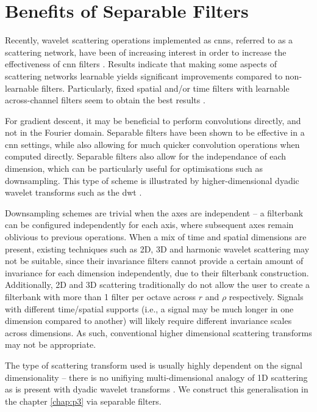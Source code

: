 \section{Benefits of Separable Filters}
\label{sec:p3i:sep}

Recently, wavelet scattering operations implemented as \acp{cnn}, referred to as a scattering network, have been of increasing interest in order to increase the effectiveness of \ac{cnn} filters \cite{2dscattering, scattering_birdsong}. Results indicate that making some aspects of scattering networks learnable yields significant improvements compared to non-learnable filters. Particularly, fixed spatial and/or time filters with learnable across-channel filters seem to obtain the best results \cite{nnphasecollapse}.

For gradient descent, it may be beneficial to perform convolutions directly, and not in the Fourier domain. Separable filters have been shown to be effective in a \ac{cnn} settings, while also allowing for much quicker convolution operations \cite{separablecnn,separablecnn2} when computed directly. Separable filters also allow for the independance of each dimension, which can be particularly useful for optimisations such as downsampling. This type of scheme is illustrated by higher-dimensional dyadic wavelet transforms such as the \ac{dwt} \cite{waveletbook}.

Downsampling schemes are trivial when the axes are independent -- a filterbank can be configured independently for each axis, where subsequent axes remain oblivious to previous operations. When a mix of time and spatial dimensions are present, existing techniques such as 2D, 3D and harmonic wavelet scattering may not be suitable, since their invariance filters cannot provide a certain amount of invariance for each dimension independently, due to their filterbank construction. Additionally, 2D and 3D scattering traditionally do not allow the user to create a filterbank with more than 1 filter per octave across $r$ and $\rho$ respectively. Signals with different time/spatial supports (i.e., a signal may be much longer in one dimension compared to another) will likely require different invariance scales across dimensions. As such, conventional higher dimensional scattering transforms may not be appropriate. 

The type of scattering transform used is usually highly dependent on the signal dimen\-sionality -- there is no unifiying multi-dimensional analogy of 1D scattering as is present with dyadic wavelet transforms \citep{waveletbook}. We construct this generalisation in the chapter \ref*{chap:p3} via separable filters.


